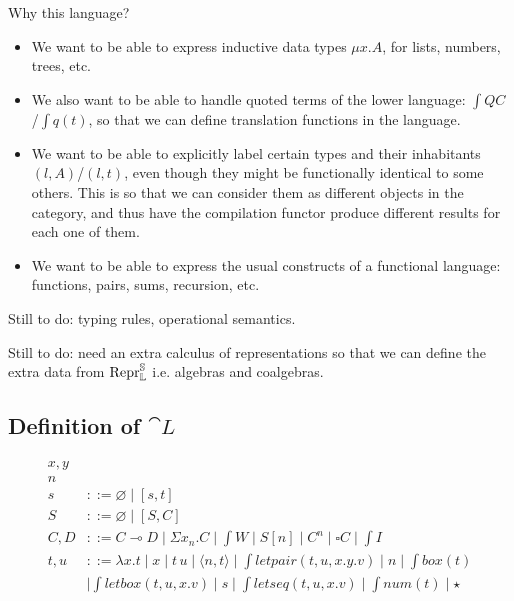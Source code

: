 Why this language?

\begin{itemize}
  \item We want to be able to express inductive data types $\mu x . A$, for lists,
        numbers, trees, etc.
  \item We also want to be able to handle quoted terms of the lower language: $\int{Q}
          C$/$\int{q}(t)$, so that we can define translation functions in the language.
  \item We want to be able to explicitly label certain types and their inhabitants $(l,
          A)$/$(l, t)$, even though they might be functionally identical to some others.
        This is so that we can consider them as different objects in the category, and
        thus have the compilation functor produce different results for each one of
        them.
  \item We want to be able to express the usual constructs of a functional language:
        functions, pairs, sums, recursion, etc.
\end{itemize}

Still to do: typing rules, operational semantics.

Still to do: need an extra calculus of representations so that we can define
the extra data from $\mathrm{Repr} _{\mathbb L} ^{\mathbb S}$ i.e. algebras and coalgebras.

\subsection{Definition of $\cat L$}

\begin{align*}
  x,y  \tag{variables}                                                                                                         \\
  n \tag{finite natural numbers, word size}                                                                                    \\
  s    & ::= \varnothing \mid [s, t] \tag{sequences}                                                                           \\
  S    & ::= \varnothing \mid [S, C] \tag{type sequences}                                                                      \\
  C, D & ::= C \multimap D \mid \Sigma x _{n} . C \mid \int{W} \mid S[n] \mid C ^n \mid \square C \mid \int{I} \tag{types}     \\
  t, u & ::= \lambda x . t \mid x \mid t\,u \mid \langle n, t \rangle \mid \int{letpair}(t, u, x.y.v) \mid n \mid \int{box}(t) \\
       & \mid \int{letbox}(t, u, x.v) \mid s \mid \int{letseq}(t, u, x.v) \mid \int{num}(t) \mid \star \tag{terms}
\end{align*}

